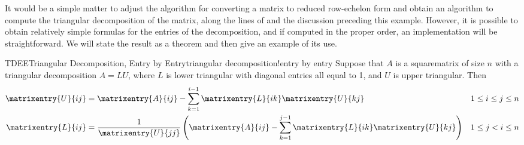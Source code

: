 %
%
It would be a simple matter to adjust the algorithm for converting a matrix to reduced row-echelon form and obtain an algorithm to compute the triangular decomposition of the matrix, along the lines of  and the discussion preceding this example.  However, it is possible to obtain relatively simple formulas for the entries of the decomposition, and if computed in the proper order, an implementation will be straightforward.  We will state the result as a theorem and then give an example of its use.
%
\begin{theorem}{TDEE}{Triangular Decomposition, Entry by Entry}{triangular decomposition!entry by entry}
Suppose that $A$ is a squarematrix of size $n$ with a triangular decomposition $A=LU$, where $L$ is lower triangular with diagonal entries all equal to 1, and $U$ is upper triangular.  Then
%
\begin{align*}
\matrixentry{U}{ij}&=
\matrixentry{A}{ij}-\sum_{k=1}^{i-1}\matrixentry{L}{ik}\matrixentry{U}{kj}
&&1\leq i\leq j\leq n\\
\matrixentry{L}{ij}&=
\frac{1}{\matrixentry{U}{jj}}
\left(\matrixentry{A}{ij}-\sum_{k=1}^{j-1}\matrixentry{L}{ik}\matrixentry{U}{kj}\right)
&&1\leq j<i\leq n
\end{align*}
%
\end{theorem}
%
